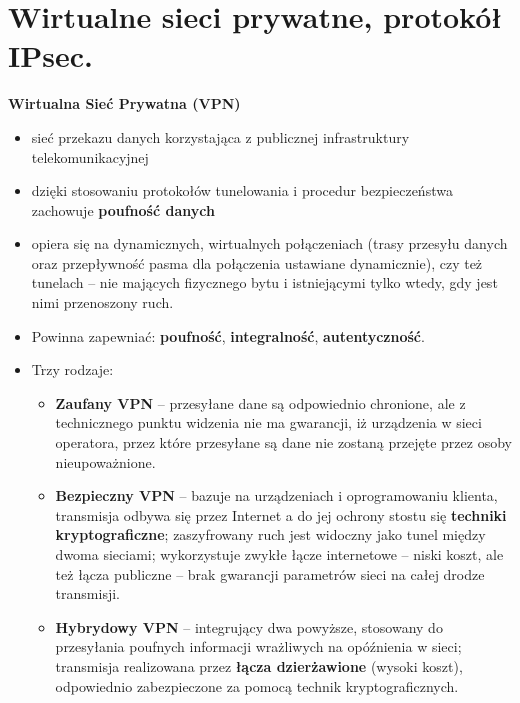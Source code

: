 \documentclass[main.tex]{subfiles}
\begin{document}
    \section{Wirtualne sieci prywatne, protokół IPsec.}
    \textbf{Wirtualna Sieć Prywatna (VPN)}
    \begin{itemize}[noitemsep]
        \item sieć przekazu danych korzystająca z publicznej infrastruktury telekomunikacyjnej
        \item dzięki stosowaniu protokołów tunelowania i procedur bezpieczeństwa zachowuje \textbf{poufność danych}
        \item opiera się na dynamicznych, wirtualnych połączeniach (trasy przesyłu danych oraz przepływność pasma dla połączenia
        ustawiane dynamicznie), czy też tunelach – nie mających fizycznego bytu i istniejącymi tylko wtedy, gdy jest nimi
        przenoszony ruch.
        \item Powinna zapewniać: \textbf{poufność}, \textbf{integralność}, \textbf{autentyczność}.

        \item Trzy rodzaje:
        \begin{itemize}
            \item \textbf{Zaufany VPN} -- przesyłane dane są odpowiednio chronione, ale z technicznego punktu
            widzenia nie ma gwarancji, iż urządzenia w sieci operatora, przez które przesyłane są dane nie zostaną
            przejęte przez osoby nieupoważnione.

            \item \textbf{Bezpieczny VPN} -- bazuje na urządzeniach i oprogramowaniu klienta, transmisja odbywa się
            przez Internet a do jej ochrony stostu się \textbf{techniki kryptograficzne}; zaszyfrowany ruch jest
            widoczny jako tunel między dwoma sieciami; wykorzystuje zwykłe łącze internetowe -- niski koszt, ale
            też łącza publiczne -- brak gwarancji parametrów sieci na całej drodze transmisji.

            \item \textbf{Hybrydowy VPN} -- integrujący dwa powyższe, stosowany do przesyłania poufnych informacji
            wrażliwych na opóźnienia w sieci; transmisja realizowana przez \textbf{łącza dzierżawione} (wysoki koszt),
            odpowiednio zabezpieczone za pomocą technik kryptograficznych.
        \end{itemize}


\end{itemize}
\end{document}
